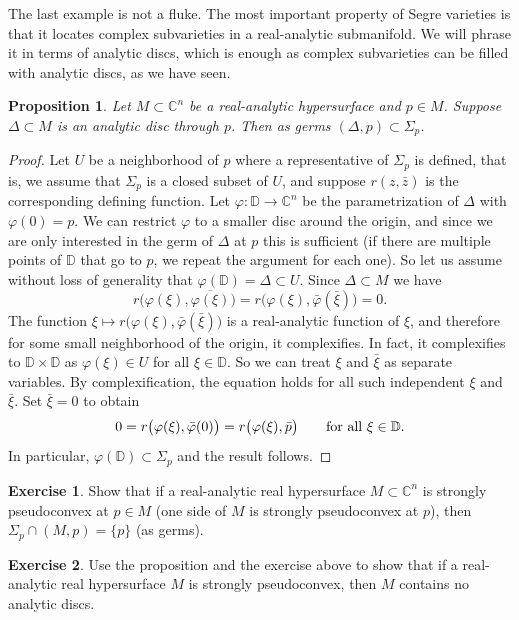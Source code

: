 \documentclass[12pt,openany]{book}
\newcommand{\avoidbreak}{\postdisplaypenalty=100}
\newcommand{\C}{{\mathbb{C}}}
\newcommand{\D}{{\mathbb{D}}}
\theoremstyle{plain}
\newtheorem{prop}[thm]{Proposition}
\theoremstyle{remark}
\theoremstyle{definition}
\newenvironment{exbox}{%
    \def\FrameCommand{\vrule width 1pt \relax\hspace{10pt}}%
    \MakeFramed{\advance\hsize-\width\FrameRestore}%
}{%
    \endMakeFramed
}
\theoremstyle{exercise}
\newtheorem{exercise}{Exercise}[section]
\theoremstyle{example}
\begin{document}
The last example is not a fluke.
The most important property of Segre varieties is that it locates complex
subvarieties in a real-analytic submanifold.
We will phrase it in terms of analytic discs, which is
enough as complex subvarieties can be filled with analytic discs,
as we have seen.

\begin{prop}
Let $M \subset \C^n$ be a real-analytic hypersurface and $p \in M$.
Suppose $\Delta \subset M$ is an analytic disc
through $p$.  Then as germs $(\Delta,p) \subset \Sigma_p$.
\end{prop}

\begin{proof}
Let $U$ be a neighborhood of $p$ where a representative
of $\Sigma_p$ is defined, that is, we assume that $\Sigma_p$ is
a closed subset of $U$, and suppose $r(z,\bar{z})$ is the corresponding
defining function.
Let $\varphi \colon \D \to \C^n$ be the parametrization of $\Delta$
with $\varphi(0) = p$.  We can restrict $\varphi$ to a smaller disc around the
origin, and since we are only interested in the germ of $\Delta$ at $p$ this
is sufficient (if there are multiple points of $\D$
that go to $p$, we repeat the argument for each one).
So let us assume without loss of generality that $\varphi(\D) = \Delta \subset U$.
Since $\Delta \subset M$ we have
\begin{equation*}
r\bigl(\varphi(\xi),\overline{\varphi(\xi)}\bigr) =
r\bigl(\varphi(\xi),\bar{\varphi}(\bar{\xi})\bigr) = 0 .
\end{equation*}
The function $\xi \mapsto
r\bigl(\varphi(\xi),\bar{\varphi}(\bar{\xi})\bigr)$ is a real-analytic
function of $\xi$, and therefore for some
small neighborhood of the origin, it complexifies.  In fact, it complexifies
to $\D \times \D$ as $\varphi(\xi) \in U$ for all $\xi \in \D$.
So we can treat $\xi$ and $\bar{\xi}$ as separate variables.  By
complexification, the equation holds for all such independent
$\xi$ and $\bar{\xi}$.  Set $\bar{\xi} = 0$ to obtain
\begin{equation*}
0 =
r\bigl(\varphi(\xi),\bar{\varphi}(0)\bigr) =
r\bigl(\varphi(\xi),\bar{p}\bigr)
\qquad \text{for all $\xi \in \D$}.
\avoidbreak
\end{equation*}
In particular, $\varphi(\D) \subset \Sigma_p$ and the result follows.
\end{proof}

\begin{exbox}
\begin{exercise}
Show that if a real-analytic real hypersurface $M \subset \C^n$ is strongly
pseudoconvex at $p \in M$ (one side of $M$ is strongly pseudoconvex at $p$),
then $\Sigma_p \cap
(M,p) = \{p\}$ (as germs).
\end{exercise}

\begin{exercise}
Use the proposition and the exercise above to show that if a real-analytic
real hypersurface $M$ is strongly
pseudoconvex, then $M$ contains no analytic discs.
\end{exercise}
\end{exbox}
\end{document}
